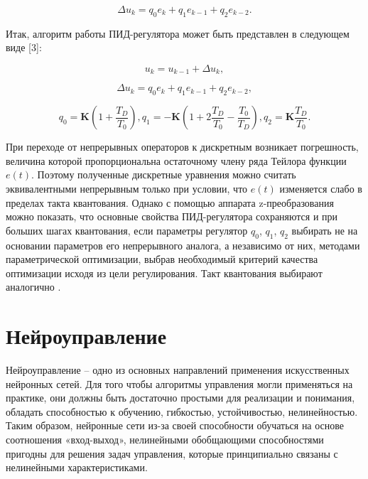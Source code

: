 \begin{equation}
    \Delta u_k = q_0 e_k + q_1 e_{k - 1} + q_2 e_{k - 2}.
\end{equation}

Итак, алгоритм работы ПИД-регулятора может быть представлен в следующем виде [3]:

\begin{equation}
    u_k = u_{k - 1} + \Delta u_k,
\end{equation}

\begin{equation}
    \Delta u_k = q_0 e_k + q_1 e_{k - 1} + q_2 e_{k - 2},
\end{equation}

\begin{equation}
    q_0 = \mathbf{K}\left(1 + \frac{T_D}{T_0}\right), q_1 = -\mathbf{K}\left(1 + 2\frac{T_D}{T_0} - \frac{T_0}{T_D}\right), q_2 = \mathbf{K}\frac{T_D}{T_0}.
\end{equation}

При переходе от непрерывных операторов к дискретным возникает погрешность, величина которой пропорциональна остаточному члену ряда Тейлора функции $e\left(t\right)$. Поэтому полученные дискретные уравнения можно считать эквивалентными непрерывным только при условии, что $e\left(t\right)$ изменяется слабо в пределах такта квантования. Однако с помощью аппарата z-преобразования можно показать, что основные свойства ПИД-регулятора сохраняются и при больших шагах квантования, если параметры регулятор $q_0$, $q_1$, $q_2$ выбирать не на основании параметров его непрерывного аналога, а независимо от них, методами параметрической оптимизации, выбрав необходимый критерий качества оптимизации исходя из цели регулирования. Такт квантования выбирают аналогично \cite{PID_NIL_AP}.

\section{Нейроуправление}

Нейроуправление – одно из основных направлений применения искусственных нейронных сетей. Для того чтобы алгоритмы управления могли применяться на практике, они должны быть достаточно простыми для реализации и понимания, обладать способностью к обучению, гибкостью, устойчивостью, нелинейностью. Таким образом, нейронные сети из-за своей способности обучаться на основе соотношения «вход-выход», нелинейными обобщающими способностями пригодны для решения задач управления, которые принципиально связаны с нелинейными характеристиками.

